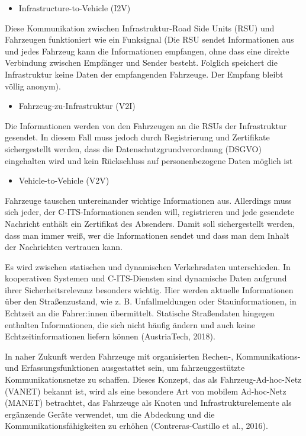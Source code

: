 \documentclass[
]{book}
\providecommand{\tightlist}{%
  \setlength{\itemsep}{0pt}\setlength{\parskip}{0pt}}
\begin{document}
\begin{itemize}
\tightlist
\item
  Infrastructure-to-Vehicle (I2V)
\end{itemize}

Diese Kommunikation zwischen Infrastruktur-Road Side Units (RSU) und Fahrzeugen funktioniert wie ein Funksignal (Die RSU sendet Informationen aus und jedes Fahrzeug kann die Informationen empfangen, ohne dass eine direkte Verbindung zwischen Empfänger und Sender besteht. Folglich speichert die Infrastruktur keine Daten der empfangenden Fahrzeuge. Der Empfang bleibt völlig anonym).

\begin{itemize}
\tightlist
\item
  Fahrzeug-zu-Infrastruktur (V2I)
\end{itemize}

Die Informationen werden von den Fahrzeugen an die RSUs der Infrastruktur gesendet. In diesem Fall muss jedoch durch Registrierung und Zertifikate sichergestellt werden, dass die Datenschutzgrundverordnung (DSGVO) eingehalten wird und kein Rückschluss auf personenbezogene Daten möglich ist

\begin{itemize}
\tightlist
\item
  Vehicle-to-Vehicle (V2V)
\end{itemize}

Fahrzeuge tauschen untereinander wichtige Informationen aus. Allerdings muss sich jeder, der C-ITS-Informationen senden will, registrieren und jede gesendete Nachricht enthält ein Zertifikat des Absenders. Damit soll sichergestellt werden, dass man immer weiß, wer die Informationen sendet und dass man dem Inhalt der Nachrichten vertrauen kann.

Es wird zwischen statischen und dynamischen Verkehrsdaten unterschieden. In kooperativen Systemen und C-ITS-Diensten sind dynamische Daten aufgrund ihrer Sicherheitsrelevanz besonders wichtig. Hier werden aktuelle Informationen über den Straßenzustand, wie z. B. Unfallmeldungen oder Stauinformationen, in Echtzeit an die Fahrer:innen übermittelt. Statische Straßendaten hingegen enthalten Informationen, die sich nicht häufig ändern und auch keine Echtzeitinformationen liefern können (AustriaTech, 2018).

In naher Zukunft werden Fahrzeuge mit organisierten Rechen-, Kommunikations- und Erfassungsfunktionen ausgestattet sein, um fahrzeuggestützte Kommunikationsnetze zu schaffen. Dieses Konzept, das als Fahrzeug-Ad-hoc-Netz (VANET) bekannt ist, wird als eine besondere Art von mobilem Ad-hoc-Netz (MANET) betrachtet, das Fahrzeuge als Knoten und Infrastrukturelemente als ergänzende Geräte verwendet, um die Abdeckung und die Kommunikationsfähigkeiten zu erhöhen (Contreras-Castillo et al., 2016).
\end{document}
